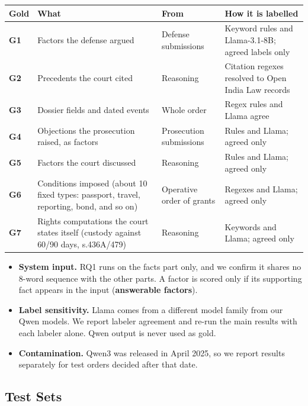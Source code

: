 \documentclass[10pt,a4paper]{article}
\begin{document}
{\small
\begin{xltabular}{\linewidth}{@{}>{\raggedright\arraybackslash{}\hsize}X>{\raggedright\arraybackslash{}\hsize}X>{\raggedright\arraybackslash{}\hsize}X>{\raggedright\arraybackslash{}\hsize}X@{}}
\toprule
\textbf{Gold} & \textbf{What} & \textbf{From} & \textbf{How it is labelled} \\
\midrule
\endhead
\textbf{G1} & Factors the defense argued & Defense submissions & Keyword rules and Llama-3.1-8B; agreed labels only \\
\textbf{G2} & Precedents the court cited & Reasoning & Citation regexes resolved to Open India Law records \\
\textbf{G3} & Dossier fields and dated events & Whole order & Regex rules and Llama agree \\
\textbf{G4} & Objections the prosecution raised, as factors & Prosecution submissions & Rules and Llama; agreed only \\
\textbf{G5} & Factors the court discussed & Reasoning & Rules and Llama; agreed only \\
\textbf{G6} & Conditions imposed (about 10 fixed types: passport, travel, reporting, bond, and so on) & Operative order of grants & Regexes and Llama; agreed only \\
\textbf{G7} & Rights computations the court states itself (custody against 60/90 days, s.436A/479) & Reasoning & Keywords and Llama; agreed only \\
\bottomrule
\end{xltabular}}

\begin{itemize}
\item \textbf{System input.} RQ1 runs on the facts part only, and we confirm it shares no 8-word sequence with the other parts. A factor is scored only if its supporting fact appears in the input (\textbf{answerable factors}).
\item \textbf{Label sensitivity.} Llama comes from a different model family from our Qwen models. We report labeler agreement and re-run the main results with each labeler alone. Qwen output is never used as gold.
\item \textbf{Contamination.} Qwen3 was released in April 2025, so we report results separately for test orders decided after that date.
\end{itemize}

\subsection{Test Sets}
\end{document}

